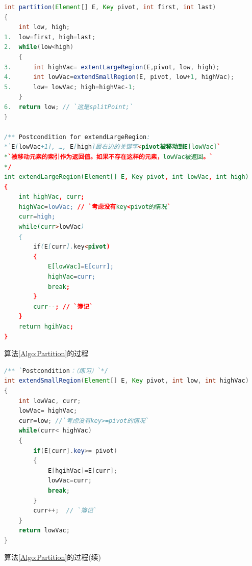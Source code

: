 \begin{figure*}[!t]
    \centering
    \begin{lstlisting}[language={Java},keywordstyle=\color{blue!70}, commentstyle=\color{red!50!green!50!blue!50}]
int partition(Element[] E, Key pivot, int first, int last)
{
    int low, high;
1.  low=first, high=last;
2.  while(low<high)
    {
3.      int highVac= extentLargeRegion(E,pivot, low, high);
4.      int lowVac=extendSmallRegion(E, pivot, low+1, highVac);
5.      low= lowVac; high=highVac-1;
    }
6.  return low; // `这是splitPoint;`
}

/** Postcondition for extendLargeRegion:
*`E[lowVac+1], …, E[high]最右边的关键字<pivot被移动到E[lowVac]`
*`被移动元素的索引作为返回值。如果不存在这样的元素，lowVac被返回。`
*/
int extendLargeRegion(Element[] E, Key pivot, int lowVac, int high)
{
    int highVac, curr;
    highVac=lowVac; // `考虑没有key<pivot的情况`
    curr=high;
    while(curr>lowVac)
    {
        if(E[curr].key<pivot)
        {
            E[lowVac]=E[curr];
            highVac=curr;
            break;
        }
        curr--; // `簿记`
    }
    return hgihVac;
}
    \end{lstlisting}
    \caption{算法\ref{Algo:Partition}的过程}
    \label{Fig:ProcedureOfPartition}
\end{figure*}

\begin{figure*}[!t]
    \centering
    \begin{lstlisting}[language={Java},keywordstyle=\color{blue!70}, commentstyle=\color{red!50!green!50!blue!50}]
/** `Postcondition：（练习）`*/
int extendSmallRegion(Element[] E, Key pivot, int low, int highVac)
{
    int lowVac, curr;
    lowVac= highVac;
    curr=low; //`考虑没有key>=pivot的情况`
    while(curr< highVac)
    {
        if(E[curr].key>= pivot)
        {
            E[hgihVac]=E[curr];
            lowVac=curr;
            break;
        }
        curr++;  // `簿记`
    }
    return lowVac;
}
    \end{lstlisting}
    \addtocounter{figure}{-1}
    \caption{算法\ref{Algo:Partition}的过程(续)}
\end{figure*}

